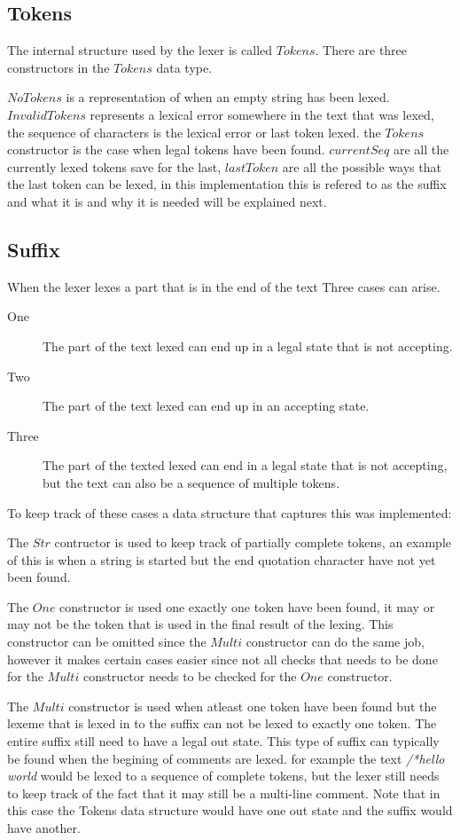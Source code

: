 \subsection{Tokens}
The internal structure used by the lexer is called $Tokens$. There are three
constructors in the $Tokens$ data type.

$NoTokens$ is a representation of when an empty string has been lexed.
$InvalidTokens$ represents a lexical error somewhere in the text that was lexed,
the sequence of characters is the lexical error or last token lexed. the
$Tokens$ constructor is the case when legal tokens have been found. $currentSeq$
are all the currently lexed tokens save for the last, $lastToken$ are all the
possible ways that the last token can be lexed, in this implementation this is
refered to as the suffix and what it is and why it is needed will be explained
next.

\subsection{Suffix}
When the lexer lexes a part that is in the end of the text Three cases can
arise.
\begin{description}
\item[One] The part of the text lexed can end up in a legal state that is not
accepting.
\item[Two] The part of the text lexed can end up in an accepting state.
\item[Three] The part of the texted lexed can end in a legal state that is not
accepting, but the text can also be a sequence of multiple tokens.
\end{description}
To keep track of these cases a data structure that captures this was
implemented:

The $Str$ contructor is used to keep track of partially complete tokens, an
example of this is when a string is started but the end quotation character have
not yet been found.

The $One$ constructor is used one exactly one token have been found, it may or
may not be the token that is used in the final result of the lexing. This
constructor can be omitted since the $Multi$ constructor can do the same job,
however it makes certain cases easier since not all checks that needs to be done
for the $Multi$ constructor needs to be checked for the $One$ constructor.

The $Multi$ constructor is used when atleast one token have been found but the
lexeme that is lexed in to the suffix can not be lexed to exactly one token. The
entire suffix still need to have a legal out state. This type of suffix can
typically be found when the begining of comments are lexed. for example the text
\emph{/*hello world} would be lexed to a sequence of complete tokens, but the
lexer still needs to keep track of the fact that it may still be a multi-line
comment. Note that in this case the Tokens data structure would have one out
state and the suffix would have another.

